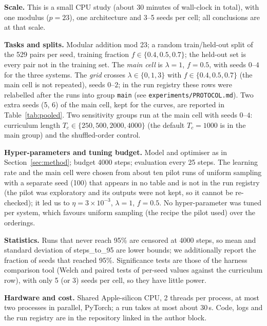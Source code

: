 \textbf{Scale.} This is a small CPU study (about 30 minutes of wall-clock in total), with one modulus ($p=23$), one architecture and 3--5 seeds per cell; all conclusions are at that scale.

\textbf{Tasks and splits.} Modular addition mod 23; a random train/held-out split of the 529 pairs per seed, training fraction $f\in\{0.4,0.5,0.7\}$; the held-out set is every pair not in the training set. The \emph{main cell} is $\lambda=1$, $f=0.5$, with seeds $0$--$4$ for the three systems. The \emph{grid} crosses $\lambda\in\{0,1,3\}$ with $f\in\{0.4,0.5,0.7\}$ (the main cell is not repeated), seeds $0$--$2$; in the run registry these rows were relabelled after the runs into group \texttt{main} (see \texttt{experiments/PROTOCOL.md}). Two extra seeds (5, 6) of the main cell, kept for the curves, are reported in Table~\ref{tab:pooled}. Two sensitivity groups run at the main cell with seeds $0$--$4$: curriculum length $T_c\in\{250,500,2000,4000\}$ (the default $T_c=1000$ is in the main group) and the shuffled-order control.

\textbf{Hyper-parameters and tuning budget.} Model and optimiser as in Section~\ref{sec:method}; budget 4000 steps; evaluation every 25 steps. The learning rate and the main cell were chosen from about ten pilot runs of uniform sampling with a separate seed (100) that appears in no table and is not in the run registry (the pilot was exploratory and its outputs were not kept, so it cannot be re-checked); it led us to $\eta=3\times10^{-3}$, $\lambda=1$, $f=0.5$. No hyper-parameter was tuned per system, which favours uniform sampling (the recipe the pilot used) over the orderings.

\textbf{Statistics.} Runs that never reach 95\% are censored at 4000 steps, so mean and standard deviation of steps\_to\_95 are lower bounds; we additionally report the fraction of seeds that reached 95\%. Significance tests are those of the harness comparison tool (Welch and paired tests of per-seed values against the curriculum row), with only 5 (or 3) seeds per cell, so they have little power.

\textbf{Hardware and cost.} Shared Apple-silicon CPU, 2 threads per process, at most two processes in parallel, PyTorch; a run takes at most about 30\,s. Code, logs and the run registry are in the repository linked in the author block.
